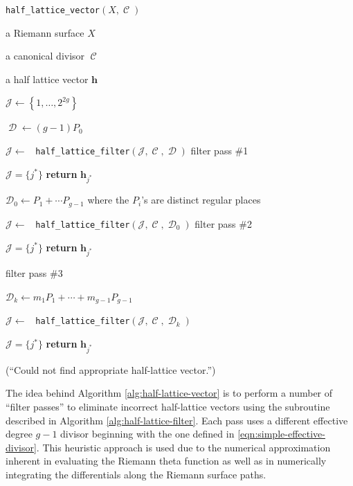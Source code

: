 \documentclass[12pt]{article}
\theoremstyle{definition}
\DeclareMathOperator{\DivC}{\mathcal{C}}
\DeclareMathOperator{\DivD}{\mathcal{D}}
\begin{document}
\begin{algorithm}[t]
\caption{{\tt half\_lattice\_vector}$(X,\DivC)$}
\label{alg:half-lattice-vector}
\begin{algorithmic}[1]

\Require a Riemann surface $X$

\Require a canonical divisor $\DivC$

\Ensure a half lattice vector $\boldsymbol{h}$

\State $\mathcal{J} \gets \left\{ 1, \ldots, 2^{2g} \right\}$

\State $\DivD \gets (g-1)P_0$

\State $\mathcal{J} \gets$ {\tt
  half\_lattice\_filter}$(\mathcal{J},\DivC,\DivD)$ \Comment filter pass \#1

 $\mathcal{J} = \{j^*\}$ {\bf return} $\boldsymbol{h}_{j^*}$

\State $\mathcal{D}_0 \gets P_1 + \cdots P_{g-1}$ where the $P_i$'s are
distinct regular places

\State $\mathcal{J} \gets$ {\tt
  half\_lattice\_filter}$(\mathcal{J},\DivC,\DivD_0)$ \Comment filter pass \#2

 $\mathcal{J} = \{j^*\}$ {\bf return} $\boldsymbol{h}_{j^*}$

 \Comment filter pass \#3

    \State $\mathcal{D}_k \gets m_1P_1 + \cdots + m_{g-1}P_{g-1}$

    \State $\mathcal{J} \gets$ {\tt
      half\_lattice\_filter}$(\mathcal{J},\DivC,\DivD_k)$

     $\mathcal{J} = \{j^*\}$ {\bf return}
    $\boldsymbol{h}_{j^*}$

\EndFor


(``Could not find appropriate half-lattice vector.'')


\end{algorithmic}
\end{algorithm}



The idea behind Algorithm \ref{alg:half-lattice-vector} is to perform a
number of ``filter passes'' to eliminate incorrect half-lattice vectors
using the subroutine described in Algorithm
\ref{alg:half-lattice-filter}. Each pass uses a different effective
degree $g-1$ divisor beginning with the one defined in
\eqref{eqn:simple-effective-divisor}. This heuristic approach is used
due to the numerical approximation inherent in evaluating the Riemann
theta function as well as in numerically integrating the differentials
along the Riemann surface paths.
\end{document}
